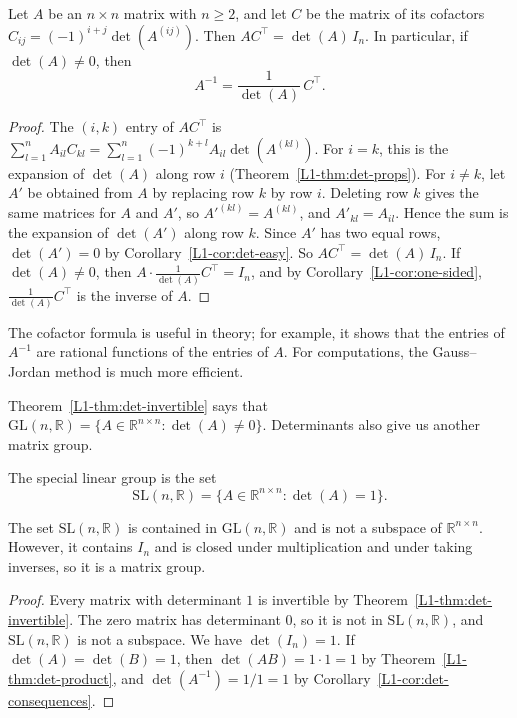 \begin{proposition}\label{L1-prop:adjugate}
    Let $A$ be an $n \times n$ matrix with $n \geq 2$, and let $C$ be the matrix of its cofactors $C_{ij} = (-1)^{i+j}\det(A^{(ij)})$. Then $AC^\top = \det(A)\, I_n$. In particular, if $\det(A) \neq 0$, then
    \[A^{-1} = \frac{1}{\det(A)}\, C^\top.\]
\end{proposition}

\begin{proof}
    The $(i, k)$ entry of $AC^\top$ is $\sum_{l=1}^n A_{il} C_{kl} = \sum_{l=1}^n (-1)^{k+l} A_{il}\det(A^{(kl)})$. For $i = k$, this is the expansion of $\det(A)$ along row $i$ (Theorem~\ref{L1-thm:det-props}). For $i \neq k$, let $A'$ be obtained from $A$ by replacing row $k$ by row $i$. Deleting row $k$ gives the same matrices for $A$ and $A'$, so $A'^{(kl)} = A^{(kl)}$, and $A'_{kl} = A_{il}$. Hence the sum is the expansion of $\det(A')$ along row $k$. Since $A'$ has two equal rows, $\det(A') = 0$ by Corollary~\ref{L1-cor:det-easy}. So $AC^\top = \det(A)\, I_n$. If $\det(A) \neq 0$, then $A \cdot \frac{1}{\det(A)}C^\top = I_n$, and by Corollary~\ref{L1-cor:one-sided}, $\frac{1}{\det(A)}C^\top$ is the inverse of $A$.
\end{proof}

The cofactor formula is useful in theory; for example, it shows that the entries of $A^{-1}$ are rational functions of the entries of $A$. For computations, the Gauss--Jordan method is much more efficient.

Theorem~\ref{L1-thm:det-invertible} says that $\mathrm{GL}(n, \mathbb{R}) = \{A \in \mathbb{R}^{n \times n} : \det(A) \neq 0\}$. Determinants also give us another matrix group.

\begin{definition}
    The special linear group is the set
    \[\mathrm{SL}(n, \mathbb{R}) = \{A \in \mathbb{R}^{n \times n} : \det(A) = 1\}.\]
\end{definition}

\begin{proposition}
    The set $\mathrm{SL}(n, \mathbb{R})$ is contained in $\mathrm{GL}(n, \mathbb{R})$ and is not a subspace of $\mathbb{R}^{n \times n}$. However, it contains $I_n$ and is closed under multiplication and under taking inverses, so it is a matrix group.
\end{proposition}

\begin{proof}
    Every matrix with determinant $1$ is invertible by Theorem~\ref{L1-thm:det-invertible}. The zero matrix has determinant $0$, so it is not in $\mathrm{SL}(n, \mathbb{R})$, and $\mathrm{SL}(n, \mathbb{R})$ is not a subspace. We have $\det(I_n) = 1$. If $\det(A) = \det(B) = 1$, then $\det(AB) = 1 \cdot 1 = 1$ by Theorem~\ref{L1-thm:det-product}, and $\det(A^{-1}) = 1/1 = 1$ by Corollary~\ref{L1-cor:det-consequences}.
\end{proof}

